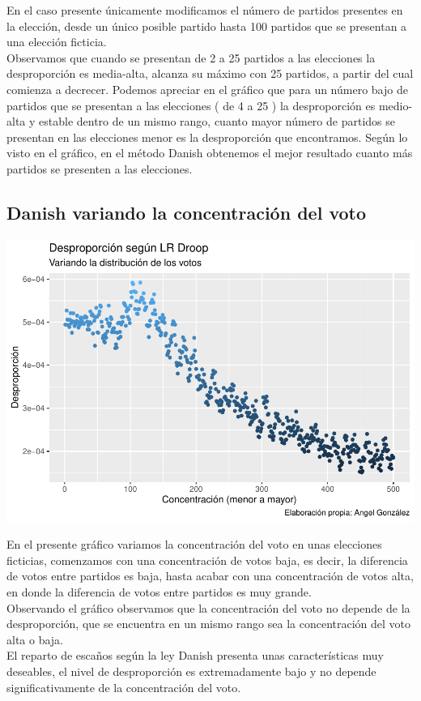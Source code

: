 \documentclass[12pt,a4paper,]{book}
\numberwithin{dummy}{section}
\theoremstyle{ocrenumbox}
\theoremstyle{blacknumex}
\theoremstyle{blacknumbox}
\theoremstyle{ocrenum}
\theoremstyle{ocrenum}
\begin{document}
En el caso presente únicamente modificamos el número de partidos
presentes en la elección, desde un único posible partido hasta 100
partidos que se presentan a una elección ficticia.\\
Observamos que cuando se presentan de 2 a 25 partidos a las elecciones
la desproporción es media-alta, alcanza su máximo con 25 partidos, a
partir del cual comienza a decrecer. Podemos apreciar en el gráfico que
para un número bajo de partidos que se presentan a las elecciones ( de 4
a 25 ) la desproporción es medio-alta y estable dentro de un mismo
rango, cuanto mayor número de partidos se presentan en las elecciones
menor es la desproporción que encontramos. Según lo visto en el gráfico,
en el método Danish obtenemos el mejor resultado cuanto más partidos se
presenten a las elecciones.

\hypertarget{danish-variando-la-concentraciuxf3n-del-voto}{%
\subsection{Danish variando la concentración del
voto}\label{danish-variando-la-concentraciuxf3n-del-voto}}

\begin{center}\includegraphics[width=0.95\linewidth]{figurasR/unnamed-chunk-48-1} \end{center}

En el presente gráfico variamos la concentración del voto en unas
elecciones ficticias, comenzamos con una concentración de votos baja, es
decir, la diferencia de votos entre partidos es baja, hasta acabar con
una concentración de votos alta, en donde la diferencia de votos entre
partidos es muy grande.\\
Observando el gráfico observamos que la concentración del voto no
depende de la desproporción, que se encuentra en un mismo rango sea la
concentración del voto alta o baja.\\
El reparto de escaños según la ley Danish presenta unas características
muy deseables, el nivel de desproporción es extremadamente bajo y no
depende significativamente de la concentración del voto.
\end{document}

